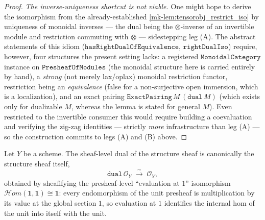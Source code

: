 \begin{proof}
  \emph{The inverse-uniqueness shortcut is not viable.} One might hope to derive the
  isomorphism from the already-established \ref{mk-lem:tensorobj_restrict_iso} by uniqueness of
  monoidal inverses --- the dual being the \(\otimes\)-inverse of an invertible module and
  restriction commuting with \(\otimes\) --- sidestepping leg (A). The abstract statements of
  this idiom (\(\mathtt{hasRightDualOfEquivalence}\), \(\mathtt{rightDualIso}\)) require,
  however, four structures the present setting lacks: a registered \(\mathtt{MonoidalCategory}\)
  instance on \(\mathtt{PresheafOfModules}\) (the monoidal structure here is carried entirely
  by hand), a \emph{strong} (not merely lax/oplax) monoidal restriction functor, restriction
  being an \emph{equivalence} (false for a non-surjective open immersion, which is a
  localization), and an exact pairing \(\mathtt{ExactPairing}\,M\,(\mathtt{dual}\,M)\) (which
  exists only for dualizable \(M\), whereas the lemma is stated for general \(M\)). Even
  restricted to the invertible consumer this would require building a coevaluation and
  verifying the zig-zag identities --- strictly \emph{more} infrastructure than leg (A) --- so
  the construction commits to legs (A) and (B) above.
\end{proof}

\begin{lemma}\label{mk-lem:dual_unit_iso}
  \leanok

  Let \(Y\) be a scheme. The sheaf-level dual of the structure sheaf is canonically the
  structure sheaf itself,
  \[
    \mathtt{dual}\,\mathcal{O}_Y \;\xrightarrow{\ \sim\ }\; \mathcal{O}_Y,
  \]
  obtained by sheafifying the presheaf-level ``evaluation at \(1\)'' isomorphism
  \(\mathcal{H}om(\mathbf{1}, \mathbf{1}) \cong \mathbf{1}\): every endomorphism of the
  unit presheaf is multiplication by its value at the global section \(1\), so evaluation
  at \(1\) identifies the internal hom of the unit into itself with the unit.
\end{lemma}

